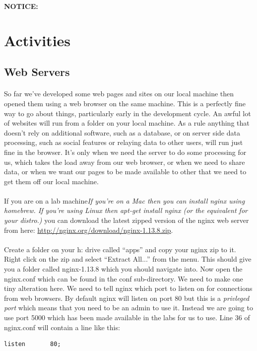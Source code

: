 \documentclass[10pt, a4paper, twosize]{article}
\begin{document}
\begin{framed}
{\bf{NOTICE:}  }
\end{framed}


\section{Activities}

\subsection{Web Servers}
\paragraph{} So far we've developed some web pages and sites on our local machine then opened them using a web browser on the same machine. This is a perfectly fine way to go about things, particularly early in the development cycle. An awful lot of websites will run from a folder on your local machine. As a rule anything that doesn't rely on additional software, such as a database, or on server side data processing, such as social features or relaying data to other users, will run just fine in the browser. It's only when we need the server to do some processing for us, which takes the load away from our web browser, or when we need to share data, or when we want our pages to be made available to other that we need to get them off our local machine.

\paragraph{} If you are on a lab machine\emph{If you're on a Mac then you can install nginx using homebrew. If you're using Linux then apt-get install nginx (or the equivalent for your distro.)} you can download the latest zipped version of the nginx web server from here: \url{http://nginx.org/download/nginx-1.13.8.zip}.

\paragraph{} Create a folder on your h: drive called ``apps'' and copy your nginx zip to it. Right click on the zip and select ``Extract All...'' from the menu. This should give you a folder called nginx-1.13.8 which you should navigate into. Now open the nginx.conf which can be found in the conf sub-directory. We need to make one tiny alteration here. We need to tell nginx which port to listen on for connections from web browsers. By default nginx will listen on port 80 but this is a \emph{privleged port} which means that you need to be an admin to use it. Instead we are going to use port 5000 which has been made available in the labs for us to use. Line 36 of nginx.conf will contain a line like this:
\begin{lstlisting}[style=DOS]
listen       80;
\end{lstlisting}
\end{document}
